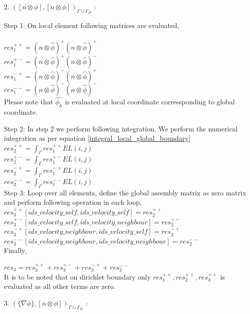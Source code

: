 \documentclass[a4paper]{book}
\begin{document}
2. $([n \otimes \phi], [n \otimes \phi])_{\Gamma \cup \Gamma_D}$ :

Step 1: On local element following matrices are evaluated,\\
\\
$res_1^{++} = (n \otimes \hat{\phi})^+ (n \otimes \hat{\phi})^+$\\
$res_1^{+-} = (n \otimes \hat{\phi})^+ (n \otimes \hat{\phi})^-$\\
$res_1^{-+} = (n \otimes \hat{\phi})^- (n \otimes \hat{\phi})^+$\\
$res_1^{--} = (n \otimes \hat{\phi})^- (n \otimes \hat{\phi})^-$\\

Please note that $\hat{\phi_h}$ is evaluated at local coordinate corressponding to global coordinate.

Step 2: In step 2 we perform following integration, 
We perform the numerical integration as per equation \ref{integral_local_global_boundary}
\\ 
$res_2^{++} = \int_{\Gamma} res_1^{++} EL(i,j)$\\
$res_2^{+-} = \int_{\Gamma} res_1^{+-} EL(i,j)$\\
$res_2^{-+} = \int_{\Gamma} res_1^{-+} EL(i,j)$\\
$res_2^{--} = \int_{\Gamma} res_1^{--} EL(i,j)$\\

Step 3: Loop over all elements, define the global assembly matrix as zero matrix and perform following operation in each loop,
\\
$res_3^{++}[ids\_velocity\_self,ids\_velocity\_self] = res_2^{++}$\\
$res_3^{+-}[ids\_velocity\_self,ids\_velocity\_neighbour] = res_2^{+-}$\\
$res_3^{-+}[ids\_velocity\_neighbour,ids\_velocity\_self] = res_2^{-+}$\\
$res_3^{--}[ids\_velocity\_neighbour,ids\_velocity\_neighbour] = res_2^{--}$\\

Finally,

$res_3 = res_3^{++} + res_3^{+-} + res_3^{-+} + res_3^{--}$\\

It is to be noted that on dirichlet boundary only $res_1^{++}, res_2^{++}, res_3^{++}$ is evaluated as all other terms are zero.

3. $(\lbrace \nabla \phi \rbrace, [n \otimes \phi])_{\Gamma \cup \Gamma_D}$ :
\end{document}
